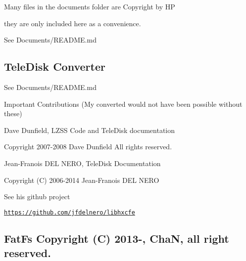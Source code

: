 \begin{DoxyItemize}
\item Many files in the documents folder are Copyright by HP
\begin{DoxyItemize}
\item they are only included here as a convenience.
\end{DoxyItemize}
\item See Documents/\+R\+E\+A\+D\+M\+E.\+md 


\end{DoxyItemize}

\subsection*{Tele\+Disk Converter}


\begin{DoxyItemize}
\item See Documents/\+R\+E\+A\+D\+M\+E.\+md
\begin{DoxyItemize}
\item Important Contributions (My converted would not have been possible without these)
\begin{DoxyItemize}
\item Dave Dunfield, L\+Z\+SS Code and Tele\+Disk documentation
\begin{DoxyItemize}
\item Copyright 2007-\/2008 Dave Dunfield All rights reserved.
\end{DoxyItemize}
\item Jean-\/\+Franois D\+EL N\+E\+RO, Tele\+Disk Documentation
\begin{DoxyItemize}
\item Copyright (C) 2006-\/2014 Jean-\/\+Franois D\+EL N\+E\+RO
\item See his github project
\begin{DoxyItemize}
\item \href{https://github.com/jfdelnero/libhxcfe}{\tt https\+://github.\+com/jfdelnero/libhxcfe} 


\end{DoxyItemize}
\end{DoxyItemize}
\end{DoxyItemize}
\end{DoxyItemize}
\end{DoxyItemize}

\subsection*{Fat\+Fs Copyright (C) 2013-\/, ChaN, all right reserved.}

